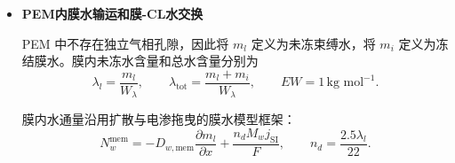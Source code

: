 \documentclass[bwprint]{gmcmthesis}
\numberwithin{equation}{section}
\numberwithin{figure}{section}
\begin{document}
\begin{itemize}
{ 令局部冻结与融化的一阶速率分别为 \(a_f\)、\(a_m\)，则采用后向欧拉库存限制后，一个时间步内的实际转移量为
\begin{equation}
\Delta m_f = m_{\text{free}} \frac{\Delta t a_f}{1 + \Delta t a_f}, \qquad \Delta m_m = m_i \frac{\Delta t a_m}{1 + \Delta t a_m}. \label{eq:src:4-32}
\end{equation}

 该形式可以保证相变转移量不超过供体相当前库存。

 当 \(T < T_f\) 时，气-固相变满足
\begin{equation}
r_{\text{dep}} = k_d [m_v - m_{\text{sat},i}]_+, \qquad r_{\text{sub}} = k_s [m_{\text{sat},i} - m_v]_+ \mathbf{1}_{m_i > 0}. \label{eq:src:4-33}
\end{equation}

当$T\ge T_f$时关闭气--冰直接相变，由融化描述冰相消失。上述气--液和气--冰通道只用于多孔层；PEM没有独立气相，采用膜水冻结/融化与膜--CL接口交换。

 为保证有限时间步下相变过程不产生负库存，实际计算中按“气-液—气-冰—液-冰”的顺序进行相态更新。以气-液过程为例：
\begin{equation}
\Delta m_c = [m_v - m_{\text{sat},l}]_+ \frac{\Delta t k_c}{1 + \Delta t k_c},
\label{eq:src:4-34}
\end{equation}
\begin{equation}
\Delta m_e = \min\left(m_l, [m_{\text{sat},l} - m_v]_+ \frac{\Delta t k_e}{1 + \Delta t k_e}\right).
\label{eq:src:4-35}
\end{equation}

 气-冰过程采用相同的库存约束思想。各次相变均从供体相减去相同质量并加入受体相，因此局部相变过程中严格保持水质量守恒。}


\item \textbf {PEM内膜水输运和膜-CL水交换}

 PEM 中不存在独立气相孔隙，因此将 \(m_l\) 定义为未冻束缚水，将 \(m_i\) 定义为冻结膜水。膜内未冻水含量和总水含量分别为
\begin{equation}
\lambda_l = \frac{m_l}{W_\lambda}, \qquad \lambda_{\text{tot}} = \frac{m_l + m_i}{W_\lambda}, \qquad EW = 1 \, \text{kg mol}^{-1}. \label{eq:src:4-36}
\end{equation}

 膜内水通量沿用扩散与电渗拖曳的膜水模型框架\cite{springer1991}：
\begin{equation}
N_w^{\text{mem}} = -D_{w,\text{mem}} \frac{\partial m_l}{\partial x} + \frac{n_d M_w j_{\mathrm{SI}}}{F}, \qquad n_d = \frac{2.5\lambda_l}{22}. \label{eq:src:4-37}
\end{equation}


\end{itemize}
\end{document}
